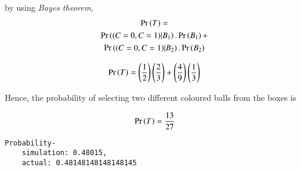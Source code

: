 \documentclass[journal,12pt,twocolumn]{IEEEtran}
\begin{document}
by using \textit{Bayes theorem},
\begin{multline}
    \Pr\left(T\right)=\\
    \Pr\left((C=0,C=1)|B_1\right).\Pr\left(B_1\right)+\\
    \Pr\left((C=0,C=1)|B_2\right).\Pr\left(B_2\right)
\end{multline}

\begin{align}
    \Pr\left(T\right)=\left(\frac{1}{2}\right)\left(\frac{2}{3}\right)+\left(\frac{4}{9}\right)\left(\frac{1}{3}\right)
\end{align}

Hence, the probability of selecting two different coloured balls from the boxes is

\begin{align}
    \Pr\left(T\right)=\frac{13}{27}
\end{align}

\begin{lstlisting}
Probability-
    simulation: 0.48015,
    actual: 0.48148148148148145
\end{lstlisting}
\end{document}
